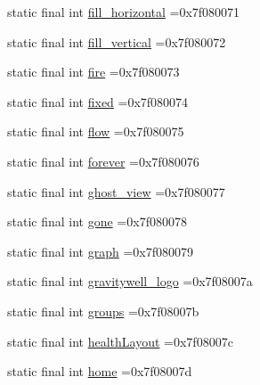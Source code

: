 \begin{DoxyCompactItemize}
\item 
static final int \mbox{\hyperlink{classcom_1_1example_1_1trainawearapplication_1_1_r_1_1id_a79456d22e5855d973008d0e5ceecf305}{fill\+\_\+horizontal}} =0x7f080071
\item 
static final int \mbox{\hyperlink{classcom_1_1example_1_1trainawearapplication_1_1_r_1_1id_aa682f7f463778120dc5785a6a4240bc0}{fill\+\_\+vertical}} =0x7f080072
\item 
static final int \mbox{\hyperlink{classcom_1_1example_1_1trainawearapplication_1_1_r_1_1id_aacc66d9a887e5f16a2fea988fe48b0e4}{fire}} =0x7f080073
\item 
static final int \mbox{\hyperlink{classcom_1_1example_1_1trainawearapplication_1_1_r_1_1id_a360e6173bdf8865acfd3abb036ea101c}{fixed}} =0x7f080074
\item 
static final int \mbox{\hyperlink{classcom_1_1example_1_1trainawearapplication_1_1_r_1_1id_a98028f28d2ae387817b156e884958662}{flow}} =0x7f080075
\item 
static final int \mbox{\hyperlink{classcom_1_1example_1_1trainawearapplication_1_1_r_1_1id_ab3a8a8bb997052077a8ffacb3087539e}{forever}} =0x7f080076
\item 
static final int \mbox{\hyperlink{classcom_1_1example_1_1trainawearapplication_1_1_r_1_1id_a989e8bdd7db628034b4750678466d77b}{ghost\+\_\+view}} =0x7f080077
\item 
static final int \mbox{\hyperlink{classcom_1_1example_1_1trainawearapplication_1_1_r_1_1id_ae01f33dfeade470958a23edbe6e6f82f}{gone}} =0x7f080078
\item 
static final int \mbox{\hyperlink{classcom_1_1example_1_1trainawearapplication_1_1_r_1_1id_a8fbc9a0c985bb3b79e3ce62a61b263b1}{graph}} =0x7f080079
\item 
static final int \mbox{\hyperlink{classcom_1_1example_1_1trainawearapplication_1_1_r_1_1id_a90b8fbfd528c6470dd0bfac1672328dc}{gravitywell\+\_\+logo}} =0x7f08007a
\item 
static final int \mbox{\hyperlink{classcom_1_1example_1_1trainawearapplication_1_1_r_1_1id_ad59991baf024e260e2f3c9bcc2dcd79a}{groups}} =0x7f08007b
\item 
static final int \mbox{\hyperlink{classcom_1_1example_1_1trainawearapplication_1_1_r_1_1id_ac7022725d1a1171b7cdc16f232b9bfc9}{health\+Layout}} =0x7f08007c
\item 
static final int \mbox{\hyperlink{classcom_1_1example_1_1trainawearapplication_1_1_r_1_1id_a5684d63ff5bab01365f176d68fedd96f}{home}} =0x7f08007d
\item 

\end{DoxyCompactItemize}
